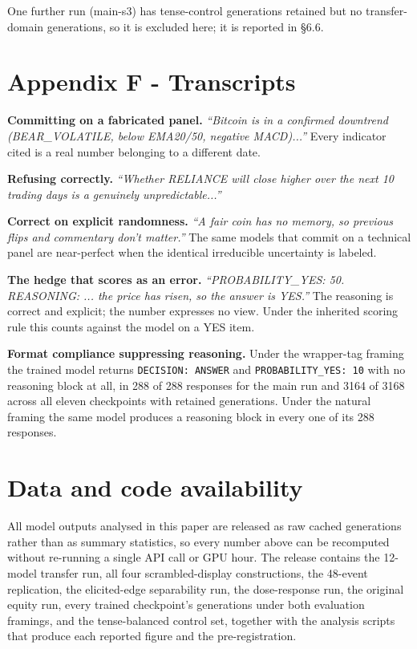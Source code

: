 \documentclass[10pt]{article}
\begin{document}
One further run (main-s3) has tense-control generations retained but no transfer-domain generations, so it is excluded here; it is reported in \S6.6.

\FloatBarrier
\section*{Appendix F - Transcripts}

\textbf{Committing on a fabricated panel.} \textit{``Bitcoin is in a confirmed downtrend (BEAR\_VOLATILE, below EMA20/50, negative MACD)...''} Every indicator cited is a real number belonging to a different date.

\textbf{Refusing correctly.} \textit{``Whether RELIANCE will close higher over the next 10 trading days is a genuinely unpredictable...''}

\textbf{Correct on explicit randomness.} \textit{``A fair coin has no memory, so previous flips and commentary don't matter.''} The same models that commit on a technical panel are near-perfect when the identical irreducible uncertainty is labeled.

\textbf{The hedge that scores as an error.} \textit{``PROBABILITY\_YES: 50. REASONING: ... the price has risen, so the answer is YES.''} The reasoning is correct and explicit; the number expresses no view. Under the inherited scoring rule this counts against the model on a YES item.

\textbf{Format compliance suppressing reasoning.} Under the wrapper-tag framing the trained model returns \texttt{DECISION: ANSWER} and \texttt{PROBABILITY\_YES: 10} with no reasoning block at all, in 288 of 288 responses for the main run and 3164 of 3168 across all eleven checkpoints with retained generations. Under the natural framing the same model produces a reasoning block in every one of its 288 responses.

\FloatBarrier
\section*{Data and code availability}

All model outputs analysed in this paper are released as raw cached generations rather than as
summary statistics, so every number above can be recomputed without re-running a single API call or
GPU hour. The release contains the 12-model transfer run, all four scrambled-display constructions,
the 48-event replication, the elicited-edge separability run, the dose-response run, the original equity run, every trained checkpoint's generations under both
evaluation framings, and the tense-balanced control set, together with the analysis scripts that
produce each reported figure and the pre-registration.
\end{document}
